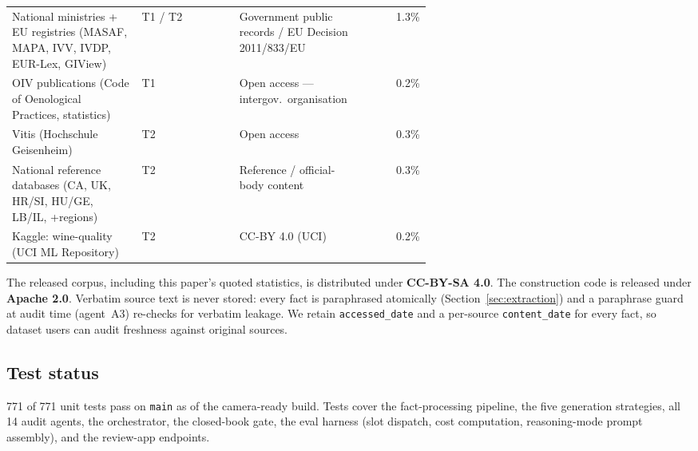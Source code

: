 \begin{table}[h]
\begin{tabular}{p{0.31\linewidth}lp{0.30\linewidth}r}
    National ministries + EU registries (MASAF, MAPA, IVV, IVDP, EUR-Lex, GIView) & T1 / T2 & Government public records / EU Decision 2011/833/EU & 1.3\% \\
    OIV publications (Code of Oenological Practices, statistics)         & T1          & Open access --- intergov.\ organisation                &  0.2\% \\
    Vitis (Hochschule Geisenheim)                                        & T2          & Open access                                            &  0.3\% \\
    National reference databases (CA, UK, HR/SI, HU/GE, LB/IL, +regions) & T2          & Reference / official-body content                      &  0.3\% \\
    Kaggle: wine-quality (UCI ML Repository)                             & T2          & CC-BY 4.0 (UCI)                                        &  0.2\% \\
    \bottomrule
  \end{tabular}
\end{table}

The released corpus, including this paper's quoted statistics, is
distributed under \textbf{CC-BY-SA 4.0}. The construction code is
released under \textbf{Apache 2.0}. Verbatim source text is never
stored: every fact is paraphrased atomically (Section~\ref{sec:extraction})
and a paraphrase guard at audit time (agent~A3) re-checks for
verbatim leakage. We retain \texttt{accessed\_date} and a per-source
\texttt{content\_date} for every fact, so dataset users can audit
freshness against original sources.

\subsection{Test status}

771 of 771 unit tests pass on \texttt{main} as of the camera-ready
build. Tests cover the fact-processing pipeline, the five generation
strategies, all 14 audit agents, the orchestrator, the closed-book
gate, the eval harness (slot dispatch, cost computation,
reasoning-mode prompt assembly), and the review-app endpoints.
